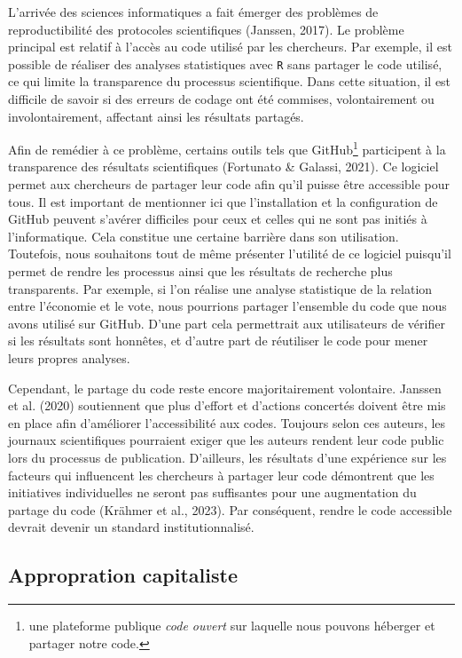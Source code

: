 \documentclass[
  letterpaper,
  DIV=11,
  numbers=noendperiod]{scrreprt}
\begin{document}
L'arrivée des sciences informatiques a fait émerger des problèmes de
reproductibilité des protocoles scientifiques (Janssen, 2017). Le
problème principal est relatif à l'accès au code utilisé par les
chercheurs. Par exemple, il est possible de réaliser des analyses
statistiques avec \texttt{R} sans partager le code utilisé, ce qui
limite la transparence du processus scientifique. Dans cette situation,
il est difficile de savoir si des erreurs de codage ont été commises,
volontairement ou involontairement, affectant ainsi les résultats
partagés.

Afin de remédier à ce problème, certains outils tels que
GitHub\footnote{une plateforme publique \emph{code ouvert} sur laquelle
  nous pouvons héberger et partager notre code.} participent à la
transparence des résultats scientifiques (Fortunato \& Galassi, 2021).
Ce logiciel permet aux chercheurs de partager leur code afin qu'il
puisse être accessible pour tous. Il est important de mentionner ici que
l'installation et la configuration de GitHub peuvent s'avérer difficiles
pour ceux et celles qui ne sont pas initiés à l'informatique. Cela
constitue une certaine barrière dans son utilisation. Toutefois, nous
souhaitons tout de même présenter l'utilité de ce logiciel puisqu'il
permet de rendre les processus ainsi que les résultats de recherche plus
transparents. Par exemple, si l'on réalise une analyse statistique de la
relation entre l'économie et le vote, nous pourrions partager l'ensemble
du code que nous avons utilisé sur GitHub. D'une part cela permettrait
aux utilisateurs de vérifier si les résultats sont honnêtes, et d'autre
part de réutiliser le code pour mener leurs propres analyses.

Cependant, le partage du code reste encore majoritairement volontaire.
Janssen et al. (2020) soutiennent que plus d'effort et d'actions
concertés doivent être mis en place afin d'améliorer l'accessibilité aux
codes. Toujours selon ces auteurs, les journaux scientifiques pourraient
exiger que les auteurs rendent leur code public lors du processus de
publication. D'ailleurs, les résultats d'une expérience sur les facteurs
qui influencent les chercheurs à partager leur code démontrent que les
initiatives individuelles ne seront pas suffisantes pour une
augmentation du partage du code (Krähmer et al., 2023). Par conséquent,
rendre le code accessible devrait devenir un standard institutionnalisé.

\subsection{Appropration capitaliste}\label{appropration-capitaliste}
\end{document}
